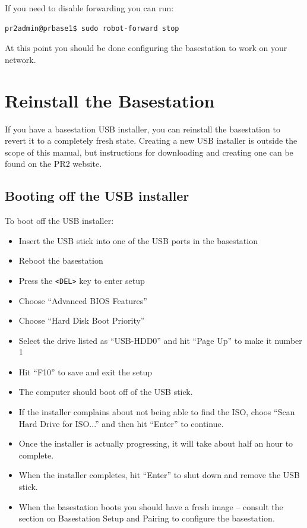 If you need to disable forwarding you can run:

\begin{verbatim}
pr2admin@prbase1$ sudo robot-forward stop
\end{verbatim}

At this point you should be done configuring the basestation to work
on your network.

\section{Reinstall the Basestation}
If you have a basestation USB installer, you can reinstall the
basestation to revert it to a completely fresh state.  Creating a new
USB installer is outside the scope of this manual, but instructions
for downloading and creating one can be found on the PR2 website.

\subsection{Booting off the USB installer}
To boot off the USB installer:
\begin{itemize}
\item Insert the USB stick into one of the USB ports in the basestation
\item Reboot the basestation
\item Press the \texttt{<DEL>} key to enter setup
\item Choose ``Advanced BIOS Features''
\item Choose ``Hard Disk Boot Priority''
\item Select the drive listed as ``USB-HDD0'' and hit ``Page Up'' to make it number 1
\item Hit ``F10'' to save and exit the setup
\item The computer should boot off of the USB stick.
\item If the installer complains about not being able to find the ISO,
  choos ``Scan Hard Drive for ISO...'' and then hit ``Enter'' to
  continue.
\item Once the installer is actually progressing, it will take about half an hour to complete.
\item When the installer completes, hit ``Enter'' to shut down and remove the USB stick.
\item When the basestation boots you should have a fresh image -- consult the section on Basestation Setup and Pairing to configure the basestation.
\end{itemize}

